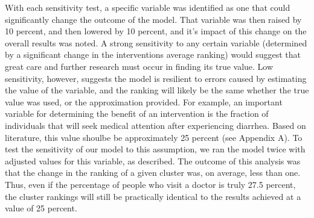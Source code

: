 With each sensitivity test, a specific variable was identified as one that could significantly change the outcome of the model.
That variable was then raised by 10 percent, and then lowered by 10 percent, and it's impact of this change on the overall results was noted.
A strong sensitivity to any certain variable (determined by a significant change in the interventions average ranking) would suggest that great care and further research must occur in finding its true value.
Low sensitivity, however, suggests the model is resilient to errors caused by estimating the value of the variable, and the ranking will likely be the same whether the true value was used, or the approximation provided.
For example, an important variable for determining the benefit of an intervention is the fraction of individuals that will seek medical attention after experiencing diarrhea.
Based on literature, this value shoulbe be approximately 25 percent (see Appendix A).
To test the sensitivity of our model to this assumption, we ran the model twice with adjusted values for this variable, as described.
The outcome of this analysis was that the change in the ranking of a given cluster was, on average, less than one.
Thus, even if the percentage of people who visit a doctor is truly 27.5 percent, the cluster rankings will still be practically identical to the results achieved at a value of 25 percent.
